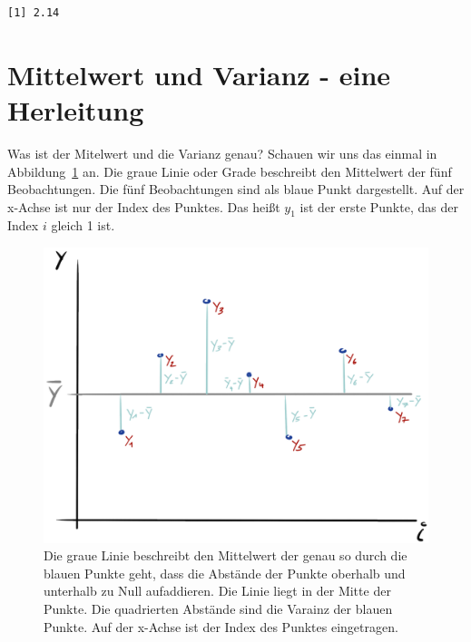 \documentclass[
  letterpaper,
]{scrbook}
\begin{document}
\begin{verbatim}
[1] 2.14
\end{verbatim}

\hypertarget{mittelwert-und-varianz---eine-herleitung}{%
\section{Mittelwert und Varianz - eine
Herleitung}\label{mittelwert-und-varianz---eine-herleitung}}

Was ist der Mitelwert und die Varianz genau? Schauen wir uns das einmal
in Abbildung~\ref{fig-mean-drawn} an. Die graue Linie oder Grade
beschreibt den Mittelwert der fünf Beobachtungen. Die fünf Beobachtungen
sind als blaue Punkt dargestellt. Auf der x-Achse ist nur der Index des
Punktes. Das heißt \(y_1\) ist der erste Punkte, das der Index \(i\)
gleich 1 ist.

\begin{figure}

{\centering \includegraphics[width=1\textwidth,height=\textheight]{./images/mean-drawn.png}

}

\caption{\label{fig-mean-drawn}Die graue Linie beschreibt den Mittelwert
der genau so durch die blauen Punkte geht, dass die Abstände der Punkte
oberhalb und unterhalb zu Null aufaddieren. Die Linie liegt in der Mitte
der Punkte. Die quadrierten Abstände sind die Varainz der blauen Punkte.
Auf der x-Achse ist der Index des Punktes eingetragen.}

\end{figure}
\end{document}
